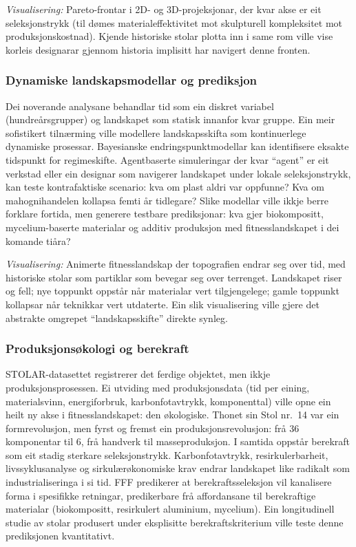 \documentclass[10pt, a4paper, twocolumn]{article}
\begin{document}
\textit{Visualisering:} Pareto-frontar i 2D- og 3D-projeksjonar, der kvar akse er eit seleksjonstrykk (til dømes materialeffektivitet mot skulpturell kompleksitet mot produksjonskostnad). Kjende historiske stolar plotta inn i same rom ville vise korleis designarar gjennom historia implisitt har navigert denne fronten.

\subsubsection{Dynamiske landskapsmodellar og prediksjon}

Dei noverande analysane behandlar tid som ein diskret variabel (hundreårsgrupper) og landskapet som statisk innanfor kvar gruppe. Ein meir sofistikert tilnærming ville modellere landskapsskifta som kontinuerlege dynamiske prosessar. Bayesianske endringspunktmodellar kan identifisere eksakte tidspunkt for regimeskifte. Agentbaserte simuleringar der kvar ``agent'' er eit verkstad eller ein designar som navigerer landskapet under lokale seleksjonstrykk, kan teste kontrafaktiske scenario: kva om plast aldri var oppfunne? Kva om mahognihandelen kollapsa femti år tidlegare? Slike modellar ville ikkje berre forklare fortida, men generere testbare prediksjonar: kva gjer biokompositt, mycelium-baserte materialar og additiv produksjon med fitnesslandskapet i dei komande tiåra?

\textit{Visualisering:} Animerte fitnesslandskap der topografien endrar seg over tid, med historiske stolar som partiklar som bevegar seg over terrenget. Landskapet riser og fell; nye toppunkt oppstår når materialar vert tilgjengelege; gamle toppunkt kollapsar når teknikkar vert utdaterte. Ein slik visualisering ville gjere det abstrakte omgrepet ``landskapsskifte'' direkte synleg.

\subsubsection{Produksjonsøkologi og berekraft}

STOLAR-datasettet registrerer det ferdige objektet, men ikkje produksjonsprosessen. Ei utviding med produksjonsdata (tid per eining, materialsvinn, energiforbruk, karbonfotavtrykk, komponenttal) ville opne ein heilt ny akse i fitnesslandskapet: den økologiske. Thonet sin Stol nr.~14 var ein formrevolusjon, men fyrst og fremst ein produksjonsrevolusjon: frå 36 komponentar til 6, frå handverk til masseproduksjon. I samtida oppstår berekraft som eit stadig sterkare seleksjonstrykk. Karbonfotavtrykk, resirkulerbarheit, livssyklusanalyse og sirkulærøkonomiske krav endrar landskapet like radikalt som industrialiseringa i si tid. FFF predikerer at berekraftsseleksjon vil kanalisere forma i spesifikke retningar, predikerbare frå affordansane til berekraftige materialar (biokompositt, resirkulert aluminium, mycelium). Ein longitudinell studie av stolar produsert under eksplisitte berekraftskriterium ville teste denne prediksjonen kvantitativt.
\end{document}
